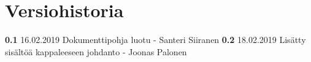 \chapter*{Versiohistoria}

\newcommand{\currentversion}{0.2} %

\textbf{0.1} 16.02.2019 Dokumenttipohja luotu - Santeri Siiranen \newline
\textbf{0.2} 18.02.2019 Lisätty sisältöä kappaleeseen johdanto - Joonas Palonen \newline
